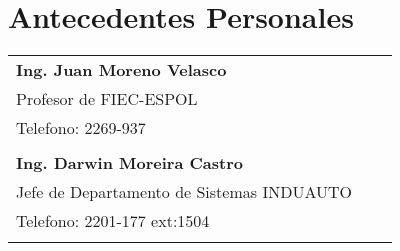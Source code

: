 \documentclass[letterpaper,11pt]{article}
\begin{document}
\section{Antecedentes Personales}
\begin{tabular}{lll}

\textbf{Ing. Juan Moreno Velasco}\\
Profesor de FIEC-ESPOL \\
Telefono: 2269-937 \\ \\

\textbf{Ing. Darwin Moreira Castro}\\
Jefe de Departamento de Sistemas INDUAUTO \\
Telefono: 2201-177 ext:1504 \\ \\

\end{tabular}
\end{document}
